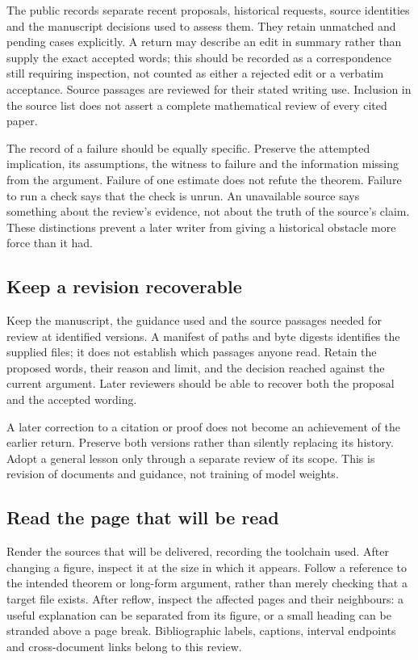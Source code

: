 The public records separate recent proposals, historical requests, source
identities and the manuscript decisions used to assess them. They retain
unmatched and pending cases explicitly. A return may describe an edit in
summary rather than supply the exact accepted words; this should be recorded
as a correspondence still requiring inspection, not counted as either a
rejected edit or a verbatim acceptance. Source passages are reviewed for their
stated writing use. Inclusion in the source list does not assert a complete
mathematical review of every cited paper.

The record of a failure should be equally specific. Preserve the attempted
implication, its assumptions, the witness to failure and the information
missing from the argument. Failure of one estimate does not refute the
theorem. Failure to run a check says that the check is unrun. An unavailable
source says something about the review's evidence, not about the truth of the
source's claim. These distinctions prevent a later writer from giving a
historical obstacle more force than it had.

\subsection{Keep a revision recoverable}

Keep the manuscript, the guidance used and the source passages needed for
review at identified versions. A manifest of paths and byte digests identifies
the supplied files; it does not establish which passages anyone read. Retain
the proposed words, their reason and limit, and the decision reached against
the current argument. Later reviewers should be able to recover both the
proposal and the accepted wording.

A later correction to a citation or proof does not become an achievement of
the earlier return. Preserve both versions rather than silently replacing
its history. Adopt a general lesson only through a separate review of its
scope. This is revision of documents and guidance, not training of model
weights.

\subsection{Read the page that will be read}

Render the sources that will be delivered, recording the toolchain used.
After changing a figure, inspect it at the size in which it appears. Follow a
reference to the intended theorem or long-form argument, rather than merely
checking that a target file exists. After reflow, inspect the affected pages
and their neighbours: a useful explanation can be separated from its figure,
or a small heading can be stranded above a page break. Bibliographic labels,
captions, interval endpoints and cross-document links belong to this review.

